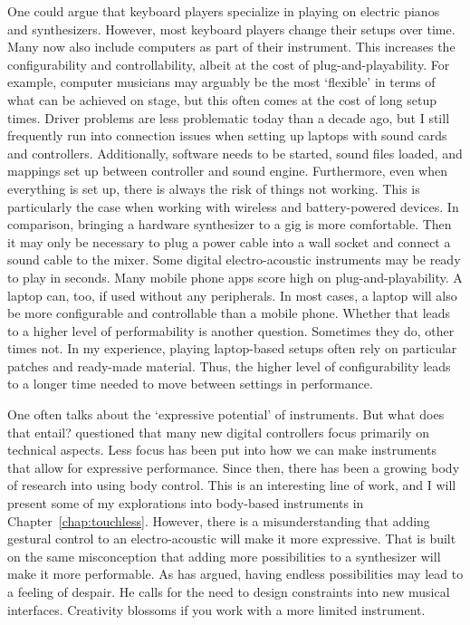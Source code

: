 One could argue that keyboard players specialize in playing on electric pianos and synthesizers. However, most keyboard players change their setups over time. Many now also include computers as part of their instrument. This increases the configurability and controllability, albeit at the cost of plug-and-playability. For example, computer musicians may arguably be the most `flexible' in terms of what can be achieved on stage, but this often comes at the cost of long setup times. Driver problems are less problematic today than a decade ago, but I still frequently run into connection issues when setting up laptops with sound cards and controllers. Additionally, software needs to be started, sound files loaded, and mappings set up between controller and sound engine. Furthermore, even when everything is set up, there is always the risk of things not working. This is particularly the case when working with wireless and battery-powered devices. In comparison, bringing a hardware synthesizer to a gig is more comfortable. Then it may only be necessary to plug a power cable into a wall socket and connect a sound cable to the mixer. Some digital electro-acoustic instruments may be ready to play in seconds. Many mobile phone apps score high on plug-and-playability. A laptop can, too, if used without any peripherals. In most cases, a laptop will also be more configurable and controllable than a mobile phone. Whether that leads to a higher level of performability is another question. Sometimes they do, other times not. In my experience, playing laptop-based setups often rely on particular patches and ready-made material. Thus, the higher level of configurability leads to a longer time needed to move between settings in performance.

One often talks about the `expressive potential' of instruments. But what does that entail? \citet{dobrian_e_2006} questioned that many new digital controllers focus primarily on technical aspects. Less focus has been put into how we can make instruments that allow for expressive performance. Since then, there has been a growing body of research into using body control. This is an interesting line of work, and I will present some of my explorations into body-based instruments in Chapter~\ref{chap:touchless}. However, there is a misunderstanding that adding gestural control to an electro-acoustic will make it more expressive. That is built on the same misconception that adding more possibilities to a synthesizer will make it more performable. As \citet{magnusson_designing_2010} has argued, having endless possibilities may lead to a feeling of despair. He calls for the need to design constraints into new musical interfaces. Creativity blossoms if you work with a more limited instrument.

